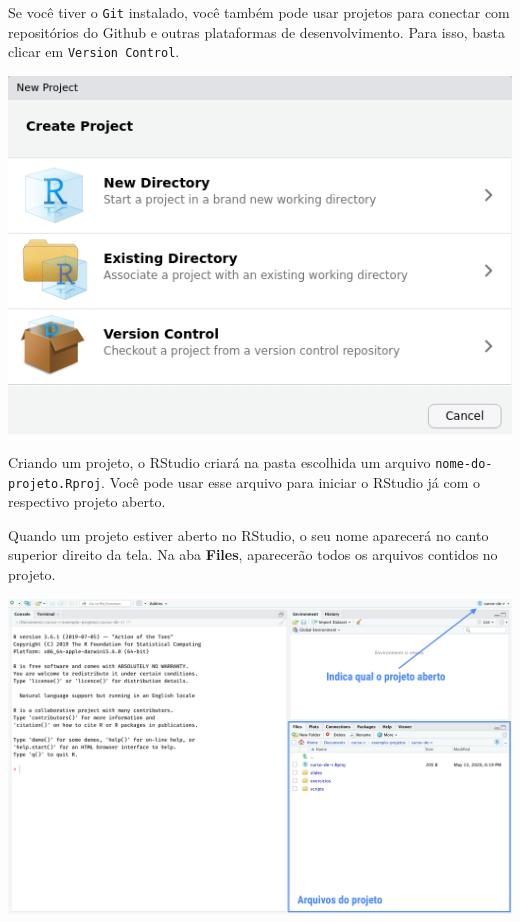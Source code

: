 \documentclass[
]{book}
\begin{document}
Se você tiver o \texttt{Git} instalado, você também pode usar projetos para conectar com repositórios do Github e outras plataformas de desenvolvimento. Para isso, basta clicar em \texttt{Version\ Control}.

\begin{center}\includegraphics[width=7.4in]{assets/img/rstudio/projetos} \end{center}

Criando um projeto, o RStudio criará na pasta escolhida um arquivo \texttt{nome-do-projeto.Rproj}. Você pode usar esse arquivo para iniciar o RStudio já com o respectivo projeto aberto.

Quando um projeto estiver aberto no RStudio, o seu nome aparecerá no canto superior direito da tela. Na aba \textbf{Files}, aparecerão todos os arquivos contidos no projeto.

\begin{center}\includegraphics[width=40in]{assets/img/rstudio/exemplo-projeto-aberto} \end{center}
\end{document}
